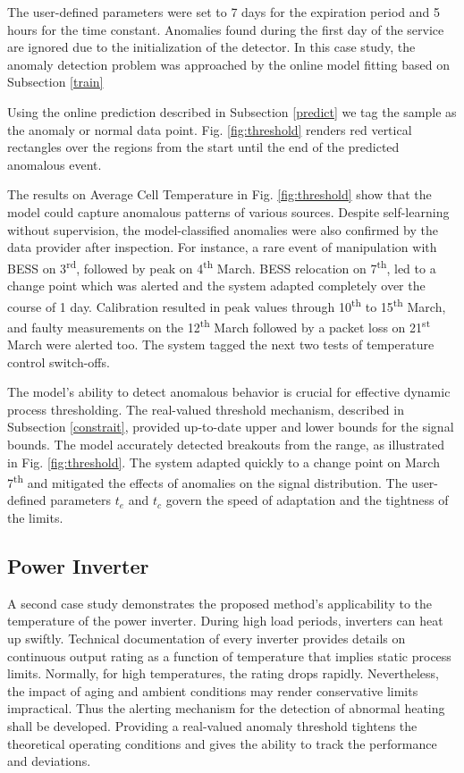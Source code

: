     The user-defined parameters were set to 7 days for the expiration period and 5 hours for the time constant. Anomalies found during the first day of the service are ignored due to the initialization of the detector. In this case study, the anomaly detection problem was approached by the online model fitting based on Subsection \ref{train}

    Using the online prediction described in Subsection \ref{predict} we tag the sample as the anomaly or normal data point. Fig. \ref{fig:threshold} renders red vertical rectangles over the regions from the start until the end of the predicted anomalous event.

    The results on Average Cell Temperature in Fig. \ref{fig:threshold} show that the model could capture anomalous patterns of various sources. Despite self-learning without supervision, the model-classified anomalies were also confirmed by the data provider after inspection. For instance, a rare event of manipulation with BESS on 3\textsuperscript{rd}, followed by peak on 4\textsuperscript{th} March. BESS relocation on 7\textsuperscript{th}, led to a change point which was alerted and the system adapted completely over the course of 1 day. Calibration resulted in peak values through 10\textsuperscript{th} to 15\textsuperscript{th} March, and faulty measurements on the 12\textsuperscript{th} March followed by a packet loss on 21\textsuperscript{st} March were alerted too. The system tagged the next two tests of temperature control switch-offs.

    The model's ability to detect anomalous behavior is crucial for effective dynamic process thresholding. The real-valued threshold mechanism, described in Subsection \ref{constrait}, provided up-to-date upper and lower bounds for the signal bounds. The model accurately detected breakouts from the range, as illustrated in Fig. \ref{fig:threshold}. The system adapted quickly to a change point on March 7\textsuperscript{th} and mitigated the effects of anomalies on the signal distribution. The user-defined parameters $t_e$ and $t_c$ govern the speed of adaptation and the tightness of the limits.

    \subsection{Power Inverter}\label{AA:Case2}
    A second case study demonstrates the proposed method's applicability to the temperature of the power inverter. During high load periods, inverters can heat up swiftly. Technical documentation of every inverter provides details on continuous output rating as a function of temperature that implies static process limits. Normally, for high temperatures, the rating drops rapidly. Nevertheless, the impact of aging and ambient conditions may render conservative limits impractical. Thus the alerting mechanism for the detection of abnormal heating shall be developed. Providing a real-valued anomaly threshold tightens the theoretical operating conditions and gives the ability to track the performance and deviations.

